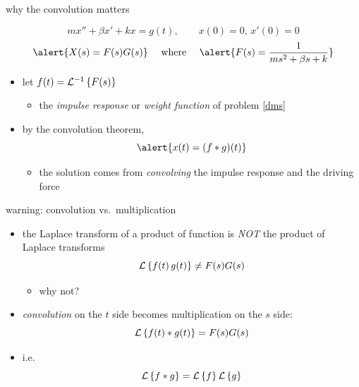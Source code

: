\documentclass[urlcolor=blue,dvipsnames]{beamer}
\begin{document}
\begin{frame}{why the convolution matters}

\begin{equation}
m x'' + \beta x' + k x = g(t), \qquad x(0)=0, \, x'(0)=0 \label{dms} \tag{$\ast$}
\end{equation}
     $$\alert{X(s) = F(s) G(s)} \quad \text{ where } \quad \alert{F(s) = \frac{1}{ms^2+\beta s+k}}$$

\begin{itemize}
\item let $f(t)=\mathcal{L}^{-1}\left\{F(s)\right\}$
    \begin{itemize}
    \item the \emph{impulse response} or \emph{weight function} of problem \eqref{dms}
    \end{itemize}
\item by the convolution theorem,
    $$\alert{x(t) = (f * g)(t)}$$

\vspace{-2mm}
    \begin{itemize}
    \item the solution comes from \emph{convolving} the impulse response and the driving force
    \end{itemize}
\end{itemize}
\end{frame}


\begin{frame}{warning: convolution vs.~multiplication}

\begin{itemize}
\item the Laplace transform of a product of function is \alert{\emph{NOT}} the product of Laplace transforms
    $$\mathcal{L}\left\{f(t)\, g(t)\right\} \neq F(s) G(s)$$

\vspace{-3mm}
    \begin{itemize}
    \item why not?
    \end{itemize}

\bigskip\bigskip\bigskip

\item \emph{convolution} on the $t$ side becomes multiplication on the $s$ side:
    $$\mathcal{L}\left\{f(t)\ast g(t)\right\} = F(s) G(s)$$
\item i.e.
    $$\mathcal{L}\left\{f\ast g\right\} = \mathcal{L}\left\{f\right\} \mathcal{L}\left\{g\right\}$$
\end{itemize}
\end{frame}
\end{document}
